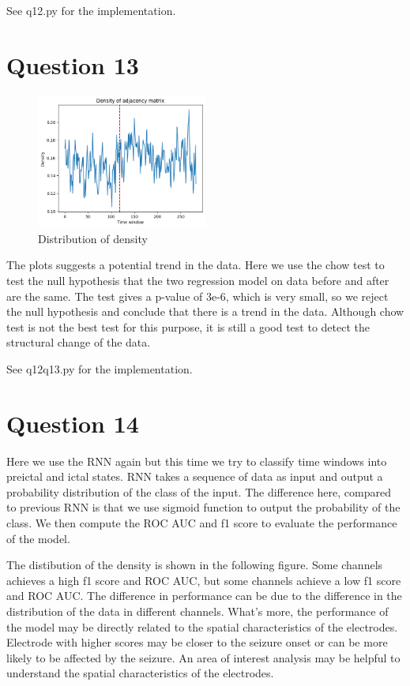 \documentclass{article}
\begin{document}
See q12.py for the implementation.

\section*{Question 13}

\begin{figure}[h!]
    \centering
    \includegraphics[width=0.5\textwidth]{figs/q13.png}
    \caption{Distribution of density}
    \label{fig: q13}
\end{figure}

The plots suggests a potential trend in the data. Here we use the chow test to test the null hypothesis that the two regression model on data before and after are the same. The test gives a p-value of 3e-6, which is very small, so we reject the null hypothesis and conclude that there is a trend in the data. Although chow test is not the best test for this purpose, it is still a good test to detect the structural change of the data.

See q12q13.py for the implementation.




\section*{Question 14}

Here we use the RNN again but this time we try to classify time windows into preictal and ictal states. RNN takes a sequence of data as input and output a probability distribution of the class of the input. The difference here, compared to previous RNN is that we use sigmoid function to output the probability of the class. We then compute the ROC AUC and f1 score to evaluate the performance of the model.

The distibution of the density is shown in the following figure. Some channels achieves a high f1 score and ROC AUC, but some channels achieve a low f1 score and ROC AUC. The difference in performance can be due to the difference in the distribution of the data in different channels. What's more, the performance of the model may be directly related to the spatial characteristics of the electrodes. Electrode with higher scores may be closer to the seizure onset or can be more likely to be affected by the seizure. An area of interest analysis may be helpful to understand the spatial characteristics of the electrodes.
\end{document}
